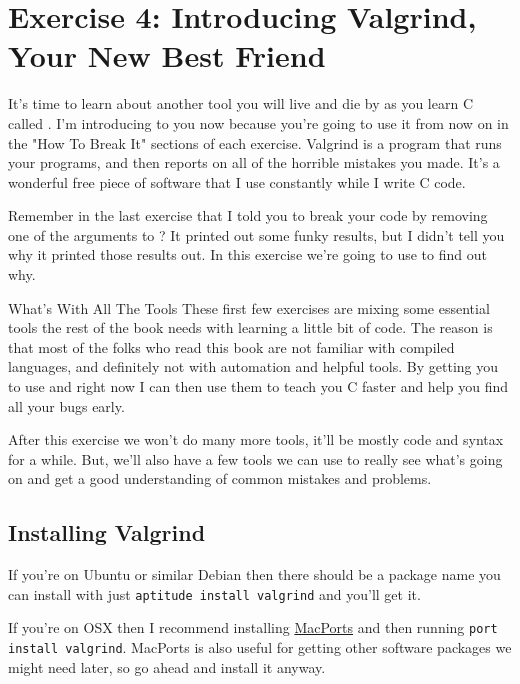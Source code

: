 \chapter{Exercise 4: Introducing Valgrind, Your New Best Friend}

It's time to learn about another tool you will live and die by as you
learn C called .  I'm introducing  to you
now because you're going to use it from now on in the "How To Break It"
sections of each exercise.  Valgrind is a program that runs your programs,
and then reports on all of the horrible mistakes you made.  It's a wonderful
free piece of software that I use constantly while I write C code.

Remember in the last exercise that I told you to break your code by
removing one of the arguments to ?  It printed out some
funky results, but I didn't tell you why it printed those results out.
In this exercise we're going to use  to find out 
why.

\begin{aside}{What's With All The Tools}
These first few exercises are mixing some essential tools the rest
of the book needs with learning a little bit of code.  The reason is
that most of the folks who read this book are not familiar with compiled
languages, and definitely not with automation and helpful tools.  By 
getting you to use  and  right now I can
then use them to teach you C faster and help you find all your bugs
early.

After this exercise we won't do many more tools, it'll be mostly
code and syntax for a while.  But, we'll also have a few tools we
can use to really see what's going on and get a good understanding
of common mistakes and problems.
\end{aside}

\section{Installing Valgrind}

If you're on Ubuntu or similar Debian then there should be a package
name  you can install with just \verb|aptitude install valgrind|
and you'll get it.

If you're on OSX then I recommend installing \href{http://www.macports.org/}{MacPorts}
and then running \verb|port install valgrind|.  MacPorts is also useful for
getting other software packages we might need later, so go ahead and install 
it anyway.

